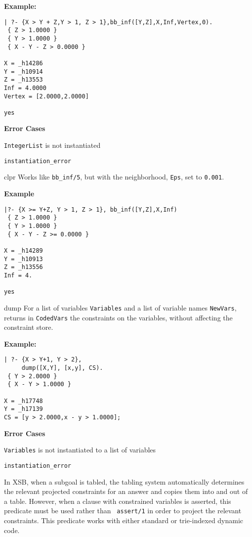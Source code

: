 \begin{description}
{\bf Example:}
{\small
\begin{verbatim}
| ?- {X > Y + Z,Y > 1, Z > 1},bb_inf([Y,Z],X,Inf,Vertex,0).
 { Z > 1.0000 }
 { Y > 1.0000 }
 { X - Y - Z > 0.0000 }

X = _h14286
Y = _h10914
Z = _h13553
Inf = 4.0000
Vertex = [2.0000,2.0000]

yes
\end{verbatim}
}
%
{\bf Error Cases}
\bi
\item 	{\tt IntegerList} is not instantiated
\bi
\item 	{\tt instantiation\_error}
\ei
\ei

  {clpr}
%
Works like {\tt bb\_inf/5}, but with the neighborhood, {\tt Eps}, set
to {\tt 0.001}.

{\bf Example}
{\small
\begin{verbatim}
|?- {X >= Y+Z, Y > 1, Z > 1}, bb_inf([Y,Z],X,Inf)
 { Z > 1.0000 }
 { Y > 1.0000 }
 { X - Y - Z >= 0.0000 }

X = _h14289
Y = _h10913
Z = _h13556
Inf = 4.

yes
\end{verbatim}
}

 {dump} 
%
For a list of variables {\tt Variables} and a list of variable names
{\tt NewVars}, returns in {\tt CodedVars} the constraints on the
variables, without affecting the constraint store.

{\bf Example:}
{\small
\begin{verbatim}
| ?- {X > Y+1, Y > 2},
     dump([X,Y], [x,y], CS).
 { Y > 2.0000 }
 { X - Y > 1.0000 }

X = _h17748
Y = _h17139
CS = [y > 2.0000,x - y > 1.0000];
\end{verbatim}
}
%
{\bf Error Cases}
\bi
\item 	{\tt Variables} is not instantiated to a list of variables
\bi
\item 	{\tt instantiation\_error}
\ei
\ei

%
In XSB, when a subgoal is tabled, the tabling system automatically
determines the relevant projected constraints for an answer and copies
them into and out of a table.  However, when a clause with constrained
variables is asserted, this predicate must be used rather than {\tt
  assert/1} in order to project the relevant constraints.  This
predicate works with either standard or trie-indexed dynamic code.


\end{description}

